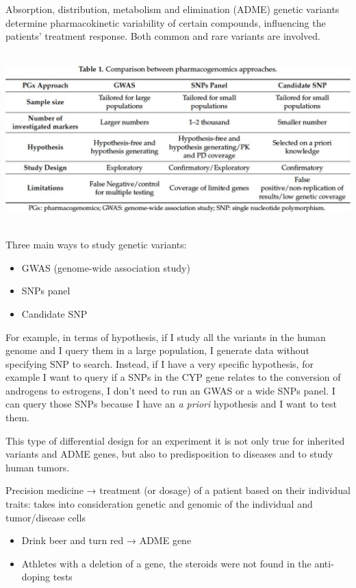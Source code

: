 Absorption, distribution, metabolism and elimination (ADME) genetic variants
determine pharmacokinetic variability of certain compounds, influencing the
patients' treatment response. Both common and rare variants are involved.

\includegraphics[width=6.18852in,height=2.6224in]{image5.jpeg}

Three main ways to study genetic variants: 

\begin{itemize}
  \item GWAS (genome-wide association study)
  \item SNPs panel
  \item Candidate SNP
\end{itemize}




For example, in terms of hypothesis, if I study all the variants in the human
genome and I query them in a large population, I generate data without
specifying SNP to search. Instead, if I have a very specific hypothesis, for
example I want to query if a SNPs in the CYP gene relates to the conversion of
androgens to estrogens, I don't need to run an GWAS or a wide SNPs panel. I can
query those SNPs because I have an \emph{a priori} hypothesis and I want to test
them.

This type of differential design for an experiment it is not only true for
inherited variants and ADME genes, but also to predisposition to diseases and to
study human tumors.

Precision medicine → treatment (or dosage) of a patient based on their
individual traits: takes into consideration genetic and genomic of the
individual and tumor/disease cells

\begin{itemize}
  \item Drink beer and turn red → ADME gene
  \item Athletes with a deletion of a gene, the steroids were not found in the
  anti-doping tests
\end{itemize}
 


